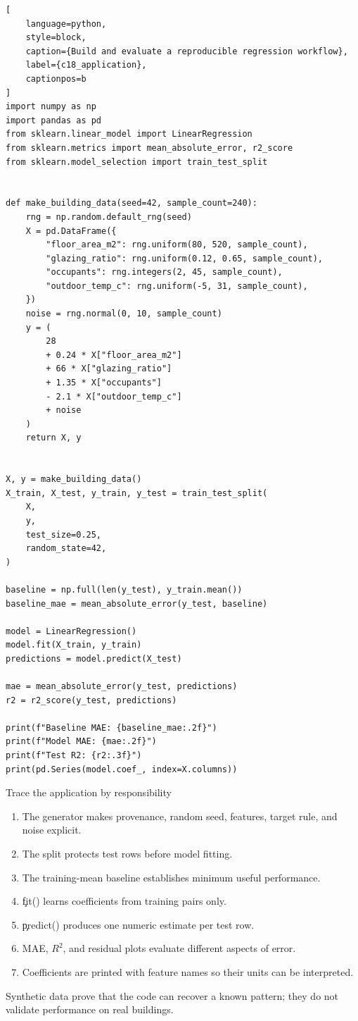 \begin{lstlisting}[
    language=python,
    style=block,
    caption={Build and evaluate a reproducible regression workflow},
    label={c18_application},
    captionpos=b
]
import numpy as np
import pandas as pd
from sklearn.linear_model import LinearRegression
from sklearn.metrics import mean_absolute_error, r2_score
from sklearn.model_selection import train_test_split


def make_building_data(seed=42, sample_count=240):
    rng = np.random.default_rng(seed)
    X = pd.DataFrame({
        "floor_area_m2": rng.uniform(80, 520, sample_count),
        "glazing_ratio": rng.uniform(0.12, 0.65, sample_count),
        "occupants": rng.integers(2, 45, sample_count),
        "outdoor_temp_c": rng.uniform(-5, 31, sample_count),
    })
    noise = rng.normal(0, 10, sample_count)
    y = (
        28
        + 0.24 * X["floor_area_m2"]
        + 66 * X["glazing_ratio"]
        + 1.35 * X["occupants"]
        - 2.1 * X["outdoor_temp_c"]
        + noise
    )
    return X, y


X, y = make_building_data()
X_train, X_test, y_train, y_test = train_test_split(
    X,
    y,
    test_size=0.25,
    random_state=42,
)

baseline = np.full(len(y_test), y_train.mean())
baseline_mae = mean_absolute_error(y_test, baseline)

model = LinearRegression()
model.fit(X_train, y_train)
predictions = model.predict(X_test)

mae = mean_absolute_error(y_test, predictions)
r2 = r2_score(y_test, predictions)

print(f"Baseline MAE: {baseline_mae:.2f}")
print(f"Model MAE: {mae:.2f}")
print(f"Test R2: {r2:.3f}")
print(pd.Series(model.coef_, index=X.columns))
\end{lstlisting}

\begin{SyntaxBox}{Trace the application by responsibility}
\begin{enumerate}
    \item The generator makes provenance, random seed, features, target rule,
          and noise explicit.
    \item The split protects test rows before model fitting.
    \item The training-mean baseline establishes minimum useful performance.
    \item \c{fit()} learns coefficients from training pairs only.
    \item \c{predict()} produces one numeric estimate per test row.
    \item MAE, $R^2$, and residual plots evaluate different aspects of error.
    \item Coefficients are printed with feature names so their units can be interpreted.
\end{enumerate}
Synthetic data prove that the code can recover a known pattern; they do not
validate performance on real buildings.
\end{SyntaxBox}

